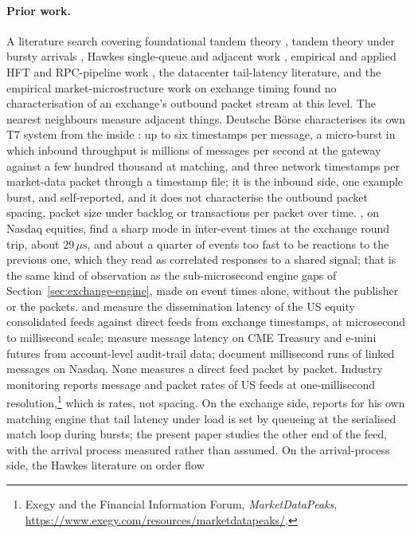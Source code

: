 \documentclass[11pt]{article}
\begin{document}
\paragraph{Prior work.} A literature search covering foundational tandem theory
\citep{jackson1957,kelly1979,burke1956,kleinrock1976,whitt1983}, tandem theory under
bursty arrivals
\citep{fosskorshunov2000,baccellifosslelarge2005,heindl2001mmpp,kimchydzinski2002mmpp,debickimandjes2015},
Hawkes single-queue and adjacent work
\citep{dawpender2018queues,chenblanchet2021,koopsboxmamandjes2018,sheldon2023,gaozhu2018jumps,gaozhu2024statedep},
empirical and applied HFT and RPC-pipeline work
\citep{byrd2020abides,frey2023jaxlob,aquilina2022arms,deanbarroso2013tailatscale,zhao2023parsimon},
the datacenter tail-latency literature, and the empirical market-microstructure work on
exchange timing found no characterisation of an exchange's outbound packet stream at
this level. The nearest neighbours measure adjacent things. Deutsche B\"orse
characterises its own T7 system from the inside \citep{deutscheboerse2026t7}: up to six
timestamps per message, a micro-burst in which inbound throughput is millions of messages per second at the gateway against a few hundred thousand at matching, and three
network timestamps per market-data packet through a timestamp file; it is the inbound
side, one example burst, and self-reported, and it does not characterise the outbound
packet spacing, packet size under backlog or transactions per packet over time.
\citet{noble2026realitygap}, on Nasdaq equities, find a sharp mode in inter-event times
at the exchange round trip, about $29\,\mu\mathrm{s}$, and about a quarter of events too
fast to be reactions to the previous one, which they read as correlated responses to a
shared signal; that is the same kind of observation as the sub-microsecond engine gaps of
Section~\ref{sec:exchange-engine}, made on event times alone, without the publisher or
the packets. \citet{bartlettmccrary2019} and \citet{dinghannahendershott2014} measure the
dissemination latency of the US equity consolidated feeds against direct feeds from
exchange timestamps, at microsecond to millisecond scale; \citet{fishehaynesonur2016}
measure message latency on CME Treasury and e-mini futures from account-level audit-trail
data; \citet{hasbrouck2013lowlatency} document millisecond runs of linked messages on
Nasdaq. None measures a direct feed packet by packet. Industry monitoring reports message
and packet rates of US feeds at one-millisecond resolution,\footnote{Exegy and the
Financial Information Forum, \emph{MarketDataPeaks},
\url{https://www.exegy.com/resources/marketdatapeaks/}.} which is rates, not spacing. On the exchange side, \citet{yoon2026matching} reports for his own matching engine that tail latency under load is set by queueing at the serialised match loop during bursts; the present paper studies the other end of the feed, with the arrival process measured rather than assumed. On the arrival-process side, the Hawkes literature on order flow
\end{document}
